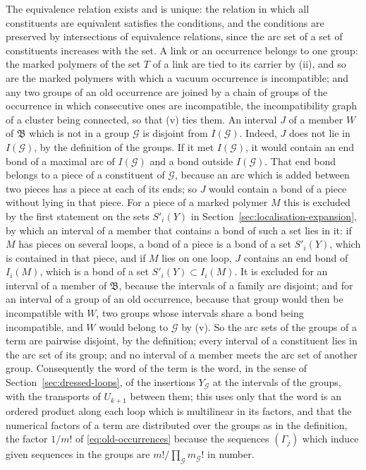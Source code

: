 \documentclass[11pt]{preprint}
\numberwithin{equation}{section}
\theoremstyle{definition}
\theoremstyle{remark}
\theoremstyle{plain}
\begin{document}
The equivalence relation exists and is unique: the relation in which all constituents are equivalent satisfies the conditions, and the conditions are preserved by intersections of equivalence relations, since the arc set of a set of constituents increases with the set. A link or an occurrence belongs to one group: the marked polymers of the set $T$ of a link are tied to its carrier by (ii), and so are the marked polymers with which a vacuum occurrence is incompatible; and any two groups of an old occurrence are joined by a chain of groups of the occurrence in which consecutive ones are incompatible, the incompatibility graph of a cluster being connected, so that (v) ties them. An interval $J$ of a member $W$ of $\mathfrak B$ which is not in a group $\mathcal G$ is disjoint from $I(\mathcal G)$. Indeed, $J$ does not lie in $I(\mathcal G)$, by the definition of the groups. If it met $I(\mathcal G)$, it would contain an end bond of a maximal arc of $I(\mathcal G)$ and a bond outside $I(\mathcal G)$. That end bond belongs to a piece of a constituent of $\mathcal G$, because an arc which is added between two pieces has a piece at each of its ends; so $J$ would contain a bond of a piece without lying in that piece. For a piece of a marked polymer $M$ this is excluded by the first statement on the sets $S'_i(Y)$ in Section~\ref{sec:localisation-expansion}, by which an interval of a member that contains a bond of such a set lies in it: if $M$ has pieces on several loops, a bond of a piece is a bond of a set $S'_i(Y)$, which is contained in that piece, and if $M$ lies on one loop, $J$ contains an end bond of $I_i(M)$, which is a bond of a set $S'_i(Y) \subset I_i(M)$. It is excluded for an interval of a member of $\mathfrak B$, because the intervals of a family are disjoint; and for an interval of a group of an old occurrence, because that group would then be incompatible with $W$, two groups whose intervals share a bond being incompatible, and $W$ would belong to $\mathcal G$ by (v). So the arc sets of the groups of a term are pairwise disjoint, by the definition; every interval of a constituent lies in the arc set of its group; and no interval of a member meets the arc set of another group. Consequently the word of the term is the word, in the sense of Section~\ref{sec:dressed-loops}, of the insertions $Y_{\mathcal G}$ at the intervals of the groups, with the transports of $U_{k+1}$ between them; this uses only that the word is an ordered product along each loop which is multilinear in its factors, and that the numerical factors of a term are distributed over the groups as in the definition, the factor $1/m!$ of \eqref{eq:old-occurrences} because the sequences $(\Gamma_j)$ which induce given sequences in the groups are $m!/\prod_{\mathcal G}m_{\mathcal G}!$ in number.
\end{document}

